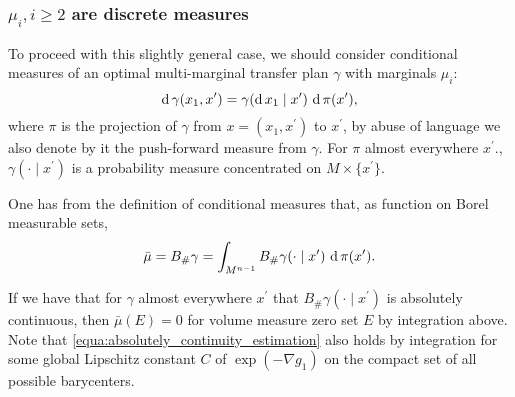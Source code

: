 \subsubsection{$\mu_i, i \geq 2$ are discrete measures}
To proceed with this slightly general case,
we should consider conditional measures of an optimal multi-marginal transfer plan $\gamma$
with marginals $\mu_i$:
\[
	\operatorname{d} \gamma(x_1, x^\prime)= \gamma(\operatorname{d} x_1 \mid x^\prime)\, \operatorname{d} \pi(x^\prime) ,
\]
where $\pi$ is the projection of $\gamma$ from $x = (x_1, x^\prime)$ to $x^\prime$,
by abuse of language we also denote by it the push-forward measure from $\gamma$.
For $\pi$ almost everywhere $x^\prime$., $\gamma(\cdot \mid x^\prime)$ is a probability measure
concentrated on $M \times \{x^\prime\}$.

One has from the definition of conditional measures that,
as function on Borel measurable sets,
\[
	\bar{\mu} = B_{\#} \gamma = \int_{M^{n-1}} B_{\#} \gamma(\cdot \mid x^\prime)\, \operatorname{d} \pi(x^\prime).
\]

If we have that for $\gamma$ almost everywhere $x^\prime$ that
$B_{\#} \gamma(\cdot \mid x^\prime)$
is absolutely continuous,
then $\bar{\mu}(E)=0$ for volume measure zero set $E$ by integration above.
Note that \cref{equa:absolutely_continuity_estimation} also holds by integration
for some global Lipschitz constant $C$ of $\exp( - \nabla g_1)$ on the compact set of all possible barycenters.

